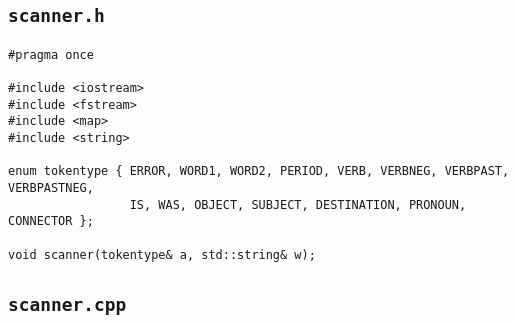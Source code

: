 \documentclass{article}
\begin{document}
	\subsection{\texttt{scanner.h}}
	\begin{Verbatim}
#pragma once

#include <iostream>
#include <fstream>
#include <map>
#include <string>

enum tokentype { ERROR, WORD1, WORD2, PERIOD, VERB, VERBNEG, VERBPAST, VERBPASTNEG,
                 IS, WAS, OBJECT, SUBJECT, DESTINATION, PRONOUN, CONNECTOR };

void scanner(tokentype& a, std::string& w);
	\end{Verbatim}
	
	\subsection{\texttt{scanner.cpp}}
\end{document}

